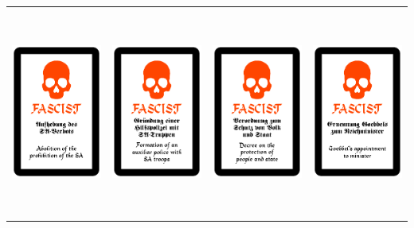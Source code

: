 \documentclass[12pt,a4paper,spanish]{article}
\begin{document}
	
	\begin{table}
		\centering
		\begin{tabular}{|c|c|c|c|}
			\toprule
			\includegraphics[height=6.85cm]{./Drawings/fascist1.pdf} &
			\includegraphics[height=6.85cm]{./Drawings/fascist2.pdf} &
			\includegraphics[height=6.85cm]{./Drawings/fascist3.pdf} &
			\includegraphics[height=6.85cm]{./Drawings/fascist4.pdf} \\

\end{tabular}
\end{table}
\end{document}
